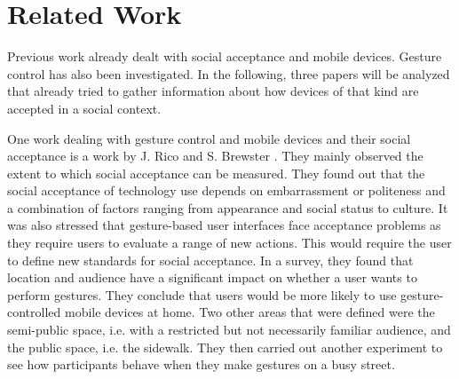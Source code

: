 \documentclass[sigchi]{acmart}
\begin{document}
\section{Related Work}

Previous work already dealt with social acceptance and mobile devices. Gesture control has also been investigated. In the following, three papers will be analyzed that already tried to gather information about how devices of that kind are accepted in a social context.

One work dealing with gesture control and mobile devices and their social acceptance is a work by J. Rico and S. Brewster \cite{rico2010usable}. They mainly observed the extent to which social acceptance can be measured. They found out that the social acceptance of technology use depends on embarrassment or politeness and a combination of factors ranging from appearance and social status to culture. It was also stressed that gesture-based user interfaces face acceptance problems as they require users to evaluate a range of new actions. This would require the user to define new standards for social acceptance. In a survey, they found that location and audience have a significant impact on whether a user wants to perform gestures. They conclude that users would be more likely to use gesture-controlled mobile devices at home. Two other areas that were defined were the semi-public space, i.e. with a restricted but not necessarily familiar audience, and the public space, i.e. the sidewalk. They then carried out another experiment to see how participants behave when they make gestures on a busy street.
\end{document}
